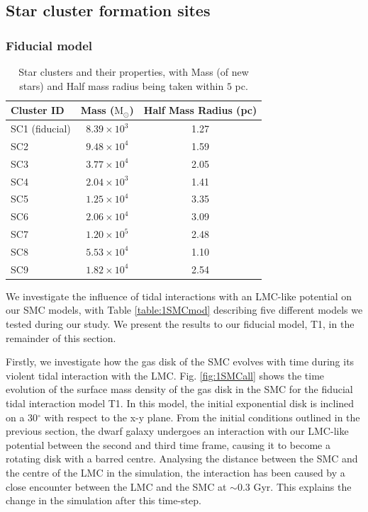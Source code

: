 \documentclass[fleqn,usenatbib]{mnras}
\begin{document}
\subsection{Star cluster formation sites}
\subsubsection{Fiducial model}

\begin{table}
\centering
 \caption{Star clusters and their properties, with Mass (of new stars) and Half mass radius being taken within $5$ pc.}
 \label{table:2SCall}
 \begin{tabular}{lcc}
  \hline
  Cluster ID & Mass ($\text{M}_\odot$) & Half Mass Radius (pc)\\ \hline 
  SC1 (fiducial) & $8.39\times10^3$ & 1.27\\
  SC2 & $9.48\times10^4$ & 1.59\\ 
  SC3 & $3.77\times10^4$ & 2.05\\ 
  SC4 & $2.04\times10^3$ & 1.41\\ 
  SC5 & $1.25\times10^4$ & 3.35\\
  SC6 & $2.06\times10^4$ & 3.09\\
  SC7 & $1.20\times10^5$ & 2.48\\
  SC8 & $5.53\times10^4$ & 1.10\\
  SC9 & $1.82\times10^4$ & 2.54\\ \hline
 \end{tabular}
\end{table}

We investigate the influence of tidal interactions with an LMC-like potential on our SMC models, with Table \ref{table:1SMCmod} describing five different models we tested during our study. We present the results to our fiducial model, T1, in the remainder of this section.


Firstly, we investigate how the gas disk of the SMC evolves with time during its violent tidal
interaction with the LMC. Fig. \ref{fig:1SMCall} shows the time evolution of the surface mass density of the gas disk in the SMC for the fiducial tidal interaction model T1. 
In this model, the initial exponential disk is inclined on a 30$^\circ$ with respect to the x-y plane.
From the initial conditions outlined in the previous section, the dwarf galaxy undergoes an interaction with our LMC-like potential between the second and third time frame, causing it to become a rotating disk with a barred centre. Analysing the distance between the SMC and the centre of the LMC in the simulation, the interaction has been caused by a close encounter between the LMC and the SMC at ${\sim}0.3$ Gyr. This explains the change in the simulation after this time-step. 
\end{document}
